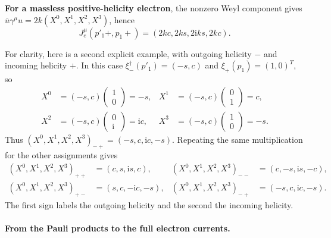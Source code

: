 \documentclass[12pt,a4paper]{article}
\numberwithin{equation}{section}
\newcommand{\ii}{\mathrm i}
\begin{document}
\textbf{For a massless positive-helicity electron}, the nonzero Weyl component gives
$\bar u\gamma^\mu u=2k(X^0,X^1,X^2,X^3)$, hence
\begin{equation}
 J^\mu_e(p'_1+,p_1+)=(2kc,2ks,2\ii ks,2kc).
 \label{eq:electron-current-example}
\end{equation}

For clarity, here is a second explicit example, with outgoing helicity $-$
and incoming helicity $+$. In this case
$\xi_-^\dagger(p'_1)=(-s,c)$ and $\xi_+(p_1)=(1,0)^T$, so
\begin{align}
 X^0&=(-s,c)\begin{pmatrix}1\\0\end{pmatrix}=-s,&
 X^1&=(-s,c)\begin{pmatrix}0\\1\end{pmatrix}=c,\\
 X^2&=(-s,c)\begin{pmatrix}0\\\ii\end{pmatrix}=\ii c,&
 X^3&=(-s,c)\begin{pmatrix}1\\0\end{pmatrix}=-s.
\end{align}
Thus $(X^0,X^1,X^2,X^3)_{-+}=(-s,c,\ii c,-s)$. Repeating the same
multiplication for the other assignments gives
\begin{align}
 (X^0,X^1,X^2,X^3)_{++}&=(c,s,\ii s,c),&
 (X^0,X^1,X^2,X^3)_{--}&=(c,-s,\ii s,-c),\\
 (X^0,X^1,X^2,X^3)_{+-}&=(s,c,-\ii c,-s),&
 (X^0,X^1,X^2,X^3)_{-+}&=(-s,c,\ii c,-s).
 \label{eq:electron-products}
\end{align}
The first sign labels the outgoing helicity and the second the incoming
helicity.

\paragraph{From the Pauli products to the full electron currents.}
\end{document}
